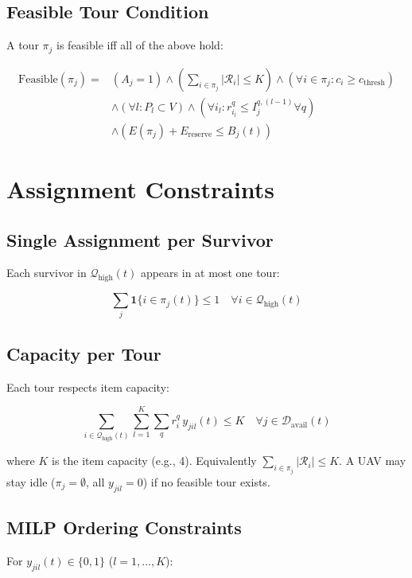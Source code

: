 \documentclass[conference]{IEEEtran}
\begin{document}
\subsection{Feasible Tour Condition}
A tour $\pi_j$ is feasible iff all of the above hold:

\begin{equation}
\begin{aligned}
\text{Feasible}(\pi_j) = &(A_j\!=\!1) \land (\!\sum_{i\in\pi_j}\!|\mathcal{R}_i|\!\leq\!K) \land (\forall i\!\in\!\pi_j\!:c_i\!\geq\!c_{\text{thresh}}) \\
&\land (\forall l\!:\!P_{l}\!\subset\!V) \land (\forall i_l\!:r_{i_l}^q\!\leq\!I_j^{q,(l-1)}\forall q) \\
&\land (E(\pi_j)+E_{\text{reserve}}\!\leq\!B_j(t))
\end{aligned}
\label{eq:feasible}
\end{equation}

\section{Assignment Constraints}

\subsection{Single Assignment per Survivor}
Each survivor in $\mathcal{Q}_{\text{high}}(t)$ appears in at most one tour:

\begin{equation}
\sum_{j} \mathbf{1}\{i\in\pi_j(t)\} \leq 1 \quad \forall i \in \mathcal{Q}_{\text{high}}(t)
\end{equation}

\subsection{Capacity per Tour}
Each tour respects item capacity:

\begin{equation}
\sum_{i\in\mathcal{Q}_{\text{high}}(t)}\sum_{l=1}^{K}\sum_q r_i^q\,y_{jil}(t) \leq K \quad \forall j \in \mathcal{D}_{\text{avail}}(t)
\end{equation}

where $K$ is the item capacity (e.g., 4). Equivalently $\sum_{i\in\pi_j}|\mathcal{R}_i|\leq K$. A UAV may stay idle ($\pi_j=\emptyset$, all $y_{jil}=0$) if no feasible tour exists.

\subsection{MILP Ordering Constraints}
For $y_{jil}(t)\in\{0,1\}$ ($l=1,\dots,K$):
\end{document}

